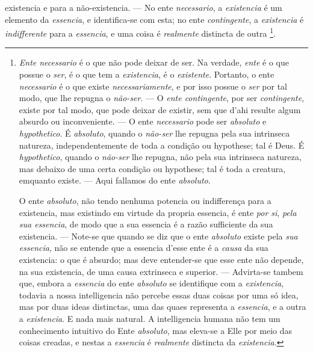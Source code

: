  existencia e para a não-existencia. --- No ente \emph{necessario}, a \emph{existencia} é um elemento da \emph{essencia}, e identifica-se com esta; no ente \emph{contingente}, a \emph{existencia} é \emph{indifferente} para a \emph{essencia}, e uma coisa é \emph{realmente} distincta de outra \footnote{\emph{Ente necessario} é o que não pode deixar de ser. Na verdade, \emph{ente} é o que possue o \emph{ser}, é o que tem a \emph{existencia}, é o \emph{existente}. Portanto, o ente \emph{necessario} é o que existe \emph{necessariamente}, e por isso possue o \emph{ser} por tal modo, que lhe repugna o \emph{não-ser}. --- O \emph{ente contingente}, por ser \emph{contingente}, existe por tal modo, que pode deixar de existir, sem que d'ahi resulte algum absurdo ou inconveniente. --- O ente \emph{necessario} pode ser \emph{absoluto} e \emph{hypothetico}. É \emph{absoluto}, quando o \emph{não-ser} lhe repugna pela sua intrinseca natureza, independentemente de toda a condição ou hypothese; tal é Deus. É \emph{hypothetico}, quando o \emph{não-ser} lhe repugna, não pela sua intrinseca natureza, mas debaixo de uma certa condição ou hypothese; tal é toda a creatura, emquanto existe. --- Aqui fallamos do ente \emph{absoluto}.\par O ente \emph{absoluto}, não tendo nenhuma potencia ou indifferença para a existencia, mas existindo em virtude da propria essencia, é ente \emph{por si}, \emph{pela sua essencia}, de modo que a sua essencia é a razão sufficiente da sua existencia. --- Note-se que quando se diz que o ente \emph{absoluto} existe pela \emph{sua essencia}, não se entende que a essencia d'esse ente é a \emph{causa} da sua existencia: o que é absurdo; mas deve entender-se que esse ente não depende, na sua existencia, de uma causa extrinseca e superior. --- Advirta-se tambem que, embora a \emph{essencia} do ente \emph{absoluto} se identifique com a \emph{existencia}, todavia a nossa intelligencia não percebe essas duas coisas por uma só idea, mas por duas ideas distinctas, uma das quaes representa a \emph{essencia}, e a outra a \emph{existencia}. E nada mais natural. A intelligencia humana não tem um conhecimento intuitivo do Ente \emph{absoluto}, mas eleva-se a Elle por meio das coisas creadas, e nestas a \emph{essencia} é \emph{realmente} distincta da \emph{existencia}.}.
